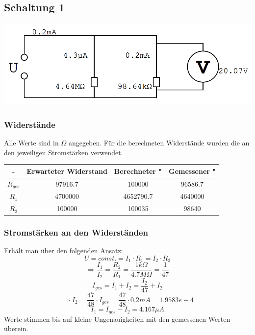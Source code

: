 \documentclass[compress,11pt]{beamer}
\begin{document}
\subsection{Schaltung 1}
\begin{frame}
\includegraphics[width=\textwidth]{images/21.png}
\end{frame}
\begin{frame}
\subsubsection{Widerstände}

Alle Werte sind in $\Omega$ angegeben. Für die berechneten Widerstände wurden die an den jeweiligen Stromstärken verwendet.\\
\begin{tabular}{|c|c|c|c|}
\hline 
- & Erwarteter Widerstand & Berechneter " & Gemessener " \\ 
\hline 
$R_{ges}$  & 97916.7 & 100000 & 96586.7 \\ 
\hline 
$R_1$ & 4700000 & 4652790.7 & 4640000 \\ 
\hline
$R_2$ & 100000 & 100035 & 98640 \\
\hline
\end{tabular}

\subsubsection{Stromstärken an den Widerständen}
Erhält man über den folgenden Ansatz:
\begin{equation}
U = const. = I_1 \cdot R_1 = I_2 \cdot R_2
\end{equation}
\begin{equation}
\Rightarrow \frac{I_1}{I_2} = \frac{R_2}{R_1} = \frac{1 k\Omega}{4.7 M\Omega} = \frac{1}{47}
\end{equation}
\begin{equation}
I_{ges} = I_1 + I_2 = \frac{I_2}{47} + I_2
\end{equation}
\begin{equation}
\Rightarrow I_2 = \frac{47}{48} \cdot I_{ges} = \frac{47}{48} \cdot 0.2 mA = 1.9583 e-4
\end{equation}
\begin{equation}
I_1 = I_{ges} - I_2 = 4.167 \mu A
\end{equation}
Werte stimmen bis auf kleine Ungenauigkeiten mit den gemessenen Werten überein.

\end{frame}
\end{document}

